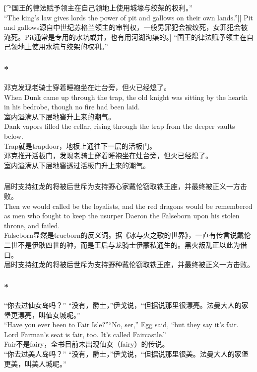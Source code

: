 \documentclass[12pt,a4paper]{article}
\newcommand{\h}[1]{{\color{red}#1}\\}
\newcommand{\la}[1]{{\color{blue}#1}\\}
\begin{document}
\subsubsection{}\t[	
	“国王的律法赋予领主在自己领地上使用城壕与绞架的权利。”\\
	“The king's law gives lords the power of pit and gallows on their own lands.”][
	Pit and gallows源自中世纪苏格兰领主的审判权，一般男罪犯会被绞死，女罪犯会被淹死。Pit通常是专用的水坑或井，也有用河湖沟渠的。]
	“国王的律法赋予领主在自己领地上使用水坑与绞架的权利。”
		
\subsubsection{\color{red}*}\la{
	邓克发现老骑士穿着睡袍坐在灶台旁，但火已经熄了。\\
	When Dunk came up through the trap, the old knight was sitting by the hearth in his bedrobe, though no fire had been laid.\\
	室内溢满从下层地窖升上来的潮气。\\
	Dank vapors filled the cellar, rising through the trap from the deeper vaults below. }\h{
	Trap就是trapdoor，地板上通往下一层的活板门。}
	邓克推开活板门，发现老骑士穿着睡袍坐在灶台旁，但火已经熄了。\\
	室内溢满从下层地窖透过活板门升上来的潮气。
	
\subsubsection{}\la{
	届时支持红龙的将被后世斥为支持野心家戴伦窃取铁王座，并最终被正义一方击败。\\
	Then we would called be the loyalists, and the red dragons would be remembered as men who fought to keep the usurper Daeron the Falseborn upon his stolen throne, and failed.}\h{
	Falseborn显然是trueborn的反义词。据《冰与火之歌的世界》，一直有传言说戴伦二世不是伊耿四世的种，而是王后与龙骑士伊蒙私通生的。黑火叛乱正以此为借口。}
	届时支持红龙的将被后世斥为支持野种戴伦窃取铁王座，并最终被正义一方击败。
	
\subsubsection{\color{red}*}\label{0.2.16}\la{
	“你去过仙女岛吗？” “没有，爵士，”伊戈说，“但据说那里很漂亮。法曼大人的家堡更漂亮，叫仙女城呢。”\\
	“Have you ever been to Fair Isle?”“No, ser,” Egg said, “but they say it's fair. Lord Farman's seat is fair, too. It's called Faircastle.”}\h{
	Fair不是fairy，全书目前未出现仙女（fairy）的传说。}
	“你去过美人岛吗？” “没有，爵士，”伊戈说，“但据说那里很美。法曼大人的家堡更美，叫美人城呢。”
	
\end{document}
